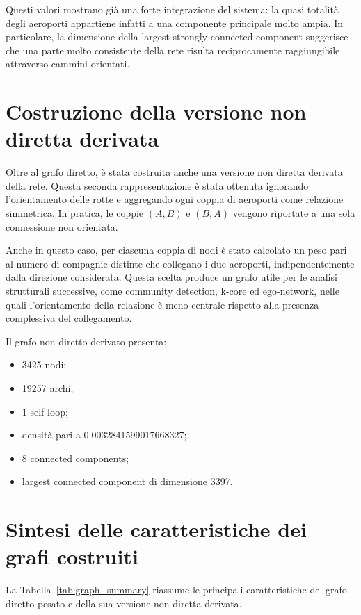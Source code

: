 Questi valori mostrano già una forte integrazione del sistema: la quasi totalità degli aeroporti appartiene infatti a una componente principale molto ampia. In particolare, la dimensione della largest strongly connected component suggerisce che una parte molto consistente della rete risulta reciprocamente raggiungibile attraverso cammini orientati.

\section{Costruzione della versione non diretta derivata}

Oltre al grafo diretto, è stata costruita anche una versione non diretta derivata della rete. Questa seconda rappresentazione è stata ottenuta ignorando l’orientamento delle rotte e aggregando ogni coppia di aeroporti come relazione simmetrica. In pratica, le coppie \((A, B)\) e \((B, A)\) vengono riportate a una sola connessione non orientata.

Anche in questo caso, per ciascuna coppia di nodi è stato calcolato un peso pari al numero di compagnie distinte che collegano i due aeroporti, indipendentemente dalla direzione considerata. Questa scelta produce un grafo utile per le analisi strutturali successive, come community detection, k-core ed ego-network, nelle quali l’orientamento della relazione è meno centrale rispetto alla presenza complessiva del collegamento.

Il grafo non diretto derivato presenta:
\begin{itemize}
    \item 3425 nodi;
    \item 19257 archi;
    \item 1 self-loop;
    \item densità pari a 0.0032841599017668327;
    \item 8 connected components;
    \item largest connected component di dimensione 3397.
\end{itemize}

\section{Sintesi delle caratteristiche dei grafi costruiti}

La Tabella~\ref{tab:graph_summary} riassume le principali caratteristiche del grafo diretto pesato e della sua versione non diretta derivata.


